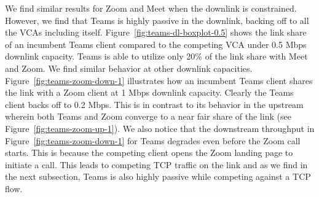 We find similar results for Zoom and Meet when the downlink is constrained. However, we find that Teams is highly passive in the downlink, backing off to all the VCAs including itself. Figure~\ref{fig:teams-dl-boxplot-0.5} shows the link share of an incumbent Teams client compared to the competing VCA under 0.5 Mbps downlink capacity. Teams is able to utilize only 20\% of the link share with Meet and Zoom. We find similar behavior at other downlink capacities. Figure~\ref{fig:teams-zoom-down-1} illustrates how an incumbent Teams client shares the link with a Zoom client at 1 Mbps downlink capacity. Clearly the Teams client backs off to 0.2 Mbps. This is in contrast to its behavior in the upstream wherein both Teams and Zoom converge to a near fair share of the link (see Figure~\ref{fig:teams-zoom-up-1}). We also notice that the downstream throughput in Figure~\ref{fig:teams-zoom-down-1} for Teams degrades even before the Zoom call starts. This is because the competing client opens the Zoom landing page to initiate a call. This leads to competing TCP traffic on the link and as we find in the next subsection, Teams is also highly passive while competing against a TCP flow. %




